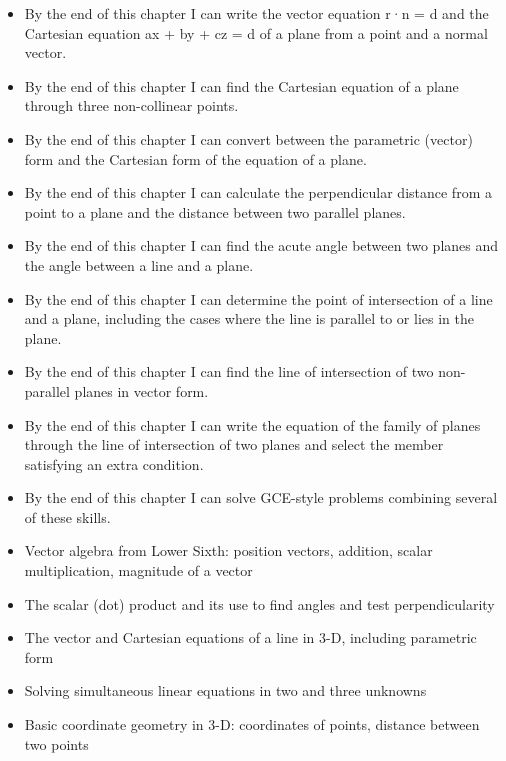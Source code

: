 \documentclass[11pt]{article}
\begin{document}
\begin{objectifs}
\begin{itemize}
\item By the end of this chapter I can write the vector equation r·n = d and the Cartesian equation ax + by + cz = d of a plane from a point and a normal vector.
\item By the end of this chapter I can find the Cartesian equation of a plane through three non-collinear points.
\item By the end of this chapter I can convert between the parametric (vector) form and the Cartesian form of the equation of a plane.
\item By the end of this chapter I can calculate the perpendicular distance from a point to a plane and the distance between two parallel planes.
\item By the end of this chapter I can find the acute angle between two planes and the angle between a line and a plane.
\item By the end of this chapter I can determine the point of intersection of a line and a plane, including the cases where the line is parallel to or lies in the plane.
\item By the end of this chapter I can find the line of intersection of two non-parallel planes in vector form.
\item By the end of this chapter I can write the equation of the family of planes through the line of intersection of two planes and select the member satisfying an extra condition.
\item By the end of this chapter I can solve GCE-style problems combining several of these skills.
\end{itemize}
\end{objectifs}

\begin{prerequis}
\begin{itemize}
\item Vector algebra from Lower Sixth: position vectors, addition, scalar multiplication, magnitude of a vector
\item The scalar (dot) product and its use to find angles and test perpendicularity
\item The vector and Cartesian equations of a line in 3-D, including parametric form
\item Solving simultaneous linear equations in two and three unknowns
\item Basic coordinate geometry in 3-D: coordinates of points, distance between two points
\end{itemize}
\end{prerequis}
\end{document}
